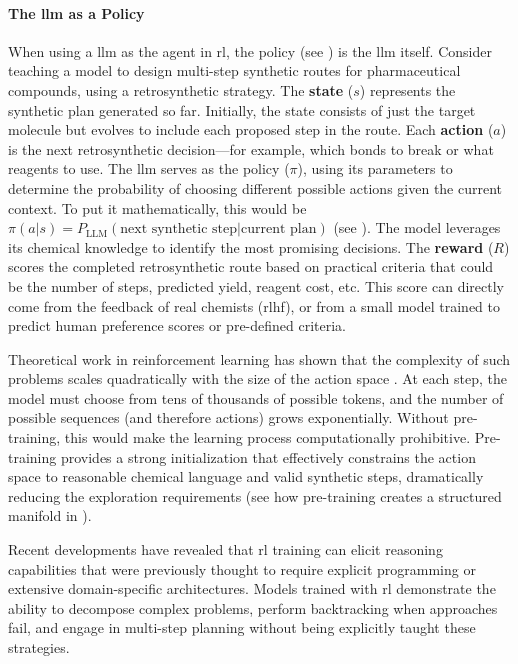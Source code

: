 \paragraph{The \gls{llm} as a Policy}
When using a \gls{llm} as the agent in \gls{rl}, the policy (see ) is the \gls{llm} itself. 
Consider teaching a model to design multi-step synthetic routes for pharmaceutical compounds, using a retrosynthetic strategy. 
The \textbf{state} ($s$) represents the synthetic plan generated so far. Initially, the state consists of just the target molecule but evolves to include each proposed step in the route. Each \textbf{action} ($a$) is the next retrosynthetic decision---for example, which bonds to break or what reagents to use. The \gls{llm} serves as the policy ($\pi$), using its parameters to determine the probability of choosing different possible actions given the current context. 
To put it mathematically, this would be $\pi(a|s) = P_{\text{LLM}}(\text{next synthetic step}|\text{current plan})$ (see ). 
The model leverages its chemical knowledge to identify the most promising decisions. 
The \textbf{reward} ($R$) scores the completed retrosynthetic route based on practical criteria that could be the number of steps, predicted yield, reagent cost, etc. 
This score can directly come from the feedback of real chemists (\gls{rlhf}), or from a small model trained to predict human preference scores or pre-defined criteria.

Theoretical work in reinforcement learning has shown that the complexity of such problems scales quadratically with the size of the action space \autocite{dann2015sample}. 
At each step, the model must choose from tens of thousands of possible tokens, and the number of possible sequences (and therefore actions) grows exponentially. 
Without pre-training, this would make the learning process computationally prohibitive. Pre-training provides a strong initialization that effectively constrains the action space to reasonable chemical language and valid synthetic steps, dramatically reducing the exploration requirements (see how pre-training creates a structured manifold in ).

Recent developments have revealed that \gls{rl} training can elicit reasoning capabilities that were previously thought to require explicit programming or extensive domain-specific architectures. 
Models trained with \gls{rl} demonstrate the ability to decompose complex problems, perform backtracking when approaches fail, and engage in multi-step planning without being explicitly taught these strategies. \autocite{xu2025towards}

